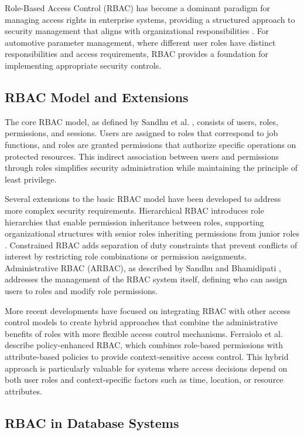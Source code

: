 Role-Based Access Control (RBAC) has become a dominant paradigm for managing access rights in enterprise systems, providing a structured approach to security management that aligns with organizational responsibilities \cite{sandhu1998role}. For automotive parameter management, where different user roles have distinct responsibilities and access requirements, RBAC provides a foundation for implementing appropriate security controls.

\subsection{RBAC Model and Extensions}
\label{subsec:rbac-model-extensions}

The core RBAC model, as defined by Sandhu et al. \cite{sandhu1998role}, consists of users, roles, permissions, and sessions. Users are assigned to roles that correspond to job functions, and roles are granted permissions that authorize specific operations on protected resources. This indirect association between users and permissions through roles simplifies security administration while maintaining the principle of least privilege.

Several extensions to the basic RBAC model have been developed to address more complex security requirements. Hierarchical RBAC introduces role hierarchies that enable permission inheritance between roles, supporting organizational structures with senior roles inheriting permissions from junior roles \cite{sandhu1998role}. Constrained RBAC adds separation of duty constraints that prevent conflicts of interest by restricting role combinations or permission assignments. Administrative RBAC (ARBAC), as described by Sandhu and Bhamidipati \cite{sandhu1997arbac97}, addresses the management of the RBAC system itself, defining who can assign users to roles and modify role permissions.

More recent developments have focused on integrating RBAC with other access control models to create hybrid approaches that combine the administrative benefits of roles with more flexible access control mechanisms. Ferraiolo et al. \cite{ferraiolo2011policy} describe policy-enhanced RBAC, which combines role-based permissions with attribute-based policies to provide context-sensitive access control. This hybrid approach is particularly valuable for systems where access decisions depend on both user roles and context-specific factors such as time, location, or resource attributes.

\subsection{RBAC in Database Systems}
\label{subsec:rbac-database-systems}


